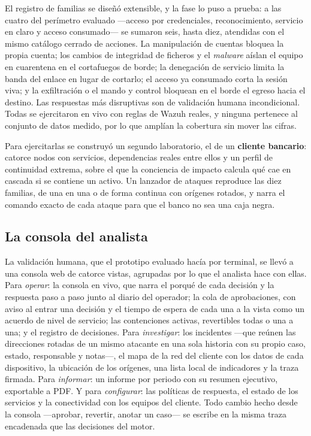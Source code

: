 El registro de familias se diseñó extensible, y la fase lo puso a prueba: a las cuatro del
perímetro evaluado ---acceso por credenciales, reconocimiento, servicio en claro y acceso
consumado--- se sumaron seis, hasta diez, atendidas con el mismo catálogo cerrado de acciones. La
manipulación de cuentas bloquea la propia cuenta; los cambios de integridad de ficheros y el
\emph{malware} aíslan el equipo en cuarentena en el cortafuegos de borde; la denegación de servicio
limita la banda del enlace en lugar de cortarlo; el acceso ya consumado corta la sesión viva; y la
exfiltración o el mando y control bloquean en el borde el egreso hacia el destino. Las respuestas
más disruptivas son de validación humana incondicional. Todas se ejercitaron en vivo con reglas de
Wazuh reales, y ninguna pertenece al conjunto de datos medido, por lo que amplían la cobertura sin
mover las cifras.

Para ejercitarlas se construyó un segundo laboratorio, el de un \textbf{cliente bancario}: catorce
nodos con servicios, dependencias reales entre ellos y un perfil de continuidad extrema, sobre el que
la conciencia de impacto calcula qué cae en cascada si se contiene un activo. Un lanzador de ataques
reproduce las diez familias, de una en una o de forma continua con orígenes rotados, y narra el
comando exacto de cada ataque para que el banco no sea una caja negra.

\subsection{La consola del analista}

La validación humana, que el prototipo evaluado hacía por terminal, se llevó a una consola web de
catorce vistas, agrupadas por lo que el analista hace con ellas. Para \emph{operar}: la consola en
vivo, que narra el porqué de cada decisión y la respuesta paso a paso junto al diario del operador;
la cola de aprobaciones, con aviso al entrar una decisión y el tiempo de espera de cada una a la
vista como un acuerdo de nivel de servicio; las contenciones activas, revertibles todas o una a una;
y el registro de decisiones. Para \emph{investigar}: los incidentes ---que reúnen las direcciones
rotadas de un mismo atacante en una sola historia con su propio caso, estado, responsable y
notas---, el mapa de la red del cliente con los datos de cada dispositivo, la ubicación de los
orígenes, una lista local de indicadores y la traza firmada. Para \emph{informar}: un informe por
periodo con su resumen ejecutivo, exportable a PDF. Y para \emph{configurar}: las políticas de
respuesta, el estado de los servicios y la conectividad con los equipos del cliente. Todo cambio
hecho desde la consola ---aprobar, revertir, anotar un caso--- se escribe en la misma traza
encadenada que las decisiones del motor.

